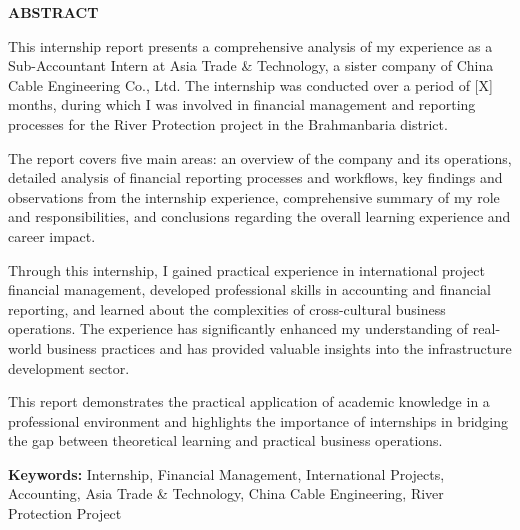 \vspace*{2cm}
{\Huge \textbf{ABSTRACT}}

\vspace{2cm}
\begin{minipage}{0.9\textwidth}
    \large
    This internship report presents a comprehensive analysis of my experience as a Sub-Accountant Intern at Asia Trade \& Technology, a sister company of China Cable Engineering Co., Ltd. The internship was conducted over a period of [X] months, during which I was involved in financial management and reporting processes for the River Protection project in the Brahmanbaria district.
    
    \vspace{1cm}
    The report covers five main areas: an overview of the company and its operations, detailed analysis of financial reporting processes and workflows, key findings and observations from the internship experience, comprehensive summary of my role and responsibilities, and conclusions regarding the overall learning experience and career impact.
    
    \vspace{1cm}
    Through this internship, I gained practical experience in international project financial management, developed professional skills in accounting and financial reporting, and learned about the complexities of cross-cultural business operations. The experience has significantly enhanced my understanding of real-world business practices and has provided valuable insights into the infrastructure development sector.
    
    \vspace{1cm}
    This report demonstrates the practical application of academic knowledge in a professional environment and highlights the importance of internships in bridging the gap between theoretical learning and practical business operations.
    
    \vspace{1cm}
    \textbf{Keywords:} Internship, Financial Management, International Projects, Accounting, Asia Trade \& Technology, China Cable Engineering, River Protection Project
\end{minipage}
\par\endgroup
